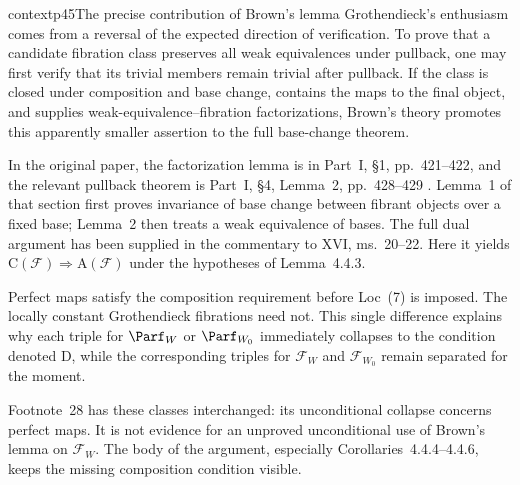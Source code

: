 \begin{dcomment}{context}{p45}{The precise contribution of Brown's lemma}
Grothendieck's enthusiasm comes from a reversal of the expected direction of verification. To prove that a candidate fibration class preserves all weak equivalences under pullback, one may first verify that its trivial members remain trivial after pullback. If the class is closed under composition and base change, contains the maps to the final object, and supplies weak-equivalence--fibration factorizations, Brown's theory promotes this apparently smaller assertion to the full base-change theorem.

In the original paper, the factorization lemma is in Part~I, \S1, pp.~421--422, and the relevant pullback theorem is Part~I, \S4, Lemma~2, pp.~428--429 \citep{Brown1973}. Lemma~1 of that section first proves invariance of base change between fibrant objects over a fixed base; Lemma~2 then treats a weak equivalence of bases. The full dual argument has been supplied in the commentary to XVI, ms.~20--22. Here it yields $\mathrm C(\mathcal F)\Rightarrow\mathrm A(\mathcal F)$ under the hypotheses of Lemma~4.4.3.

Perfect maps satisfy the composition requirement before Loc~(7) is imposed. The locally constant Grothendieck fibrations need not. This single difference explains why each triple for $\Parf_W$ or $\Parf_{W_0}$ immediately collapses to the condition denoted D, while the corresponding triples for $\mathcal F_W$ and $\mathcal F_{W_0}$ remain separated for the moment.

Footnote~28 has these classes interchanged: its unconditional collapse concerns perfect maps. It is not evidence for an unproved unconditional use of Brown's lemma on $\mathcal F_W$. The body of the argument, especially Corollaries~4.4.4--4.4.6, keeps the missing composition condition visible.
\end{dcomment}


